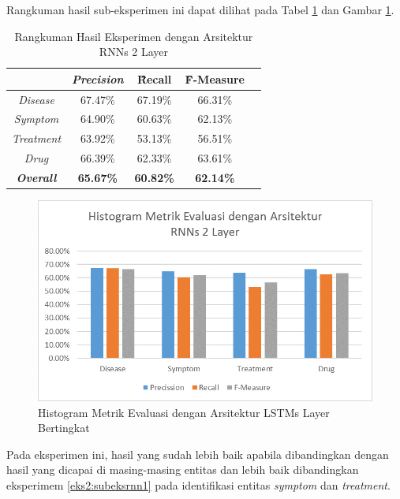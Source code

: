     Rangkuman hasil sub-eksperimen ini dapat dilihat pada Tabel \ref{table:owndict10} dan Gambar \ref{fig:owndict10}.
        
    \begin{table}
    	\centering
    	\caption{Rangkuman Hasil Eksperimen dengan Arsitektur RNNs 2 Layer}
    	\begin{tabular}{|c|c|c|c|c|}
    		\hline
    		& \textit{Precision} & \f{\f{Recall}} & \f{\f{F-Measure}} \\ \hline
    		\textit{Disease}      & 67.47\%             & 67.19\%        & 66.31\%           \\ \hline
    		\textit{Symptom}      & 64.90\%             & 60.63\%        & 62.13\%           \\ \hline
    		\textit{Treatment}    & 63.92\%             & 53.13\%        & 56.51\%           \\ \hline
    		\textit{Drug}		  & 66.39\%             & 62.33\%        & 63.61\%           \\ \hline
    		\textit{\textbf{Overall}}&\textbf{65.67\%}  & \textbf{60.82\%}& \textbf{62.14\%} \\ \hline
    	\end{tabular}
    	\label{table:owndict10}
    \end{table}
    
    \begin{figure}
    	\centering
    	\includegraphics[width=0.85\linewidth]{images/histogramrnnv2}
    	\caption{Histogram Metrik Evaluasi dengan Arsitektur LSTMs Layer Bertingkat}
    	\label{fig:owndict10}
    \end{figure}

	Pada eksperimen ini, hasil yang sudah lebih baik apabila dibandingkan dengan hasil yang dicapai \cite{skripsiKakRadit} di masing-masing entitas dan lebih baik dibandingkan eksperimem \ref{eks2:subeksrnn1} pada identifikasi entitas \textit{symptom} dan \textit{treatment}.
